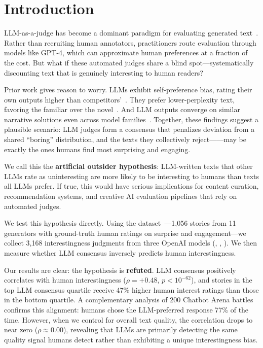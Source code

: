 \section{Introduction}
\label{sec:intro}

LLM-as-a-judge has become a dominant paradigm for evaluating generated text~\citep{zheng2023judging}.
Rather than recruiting human annotators, practitioners route evaluation through models like GPT-4, which can approximate human preferences at a fraction of the cost.
But what if these automated judges share a blind spot---systematically discounting text that is genuinely interesting to human readers?

Prior work gives reason to worry.
LLMs exhibit self-preference bias, rating their own outputs higher than competitors'~\citep{panickssery2024llm}.
They prefer lower-perplexity text, favoring the familiar over the novel~\citep{wataoka2024self}.
And LLM outputs converge on similar narrative solutions even across model families~\citep{echoes2024}.
Together, these findings suggest a plausible scenario: LLM judges form a consensus that penalizes deviation from a shared ``boring'' distribution, and the texts they collectively reject---\outsiders---may be exactly the ones humans find most surprising and engaging.

We call this the \textbf{artificial outsider hypothesis}: LLM-written texts that other LLMs rate as uninteresting are more likely to be interesting to humans than texts all LLMs prefer.
If true, this would have serious implications for content curation, recommendation systems, and creative AI evaluation pipelines that rely on automated judges.

We test this hypothesis directly.
Using the \hanna dataset~\citep{chhun2022hanna}---1,056 stories from 11 generators with ground-truth human ratings on surprise and engagement---we collect 3,168 interestingness judgments from three OpenAI models (\gptfo, \gptfomini, \gptfourmini).
We then measure whether LLM consensus inversely predicts human interestingness.

Our results are clear: the hypothesis is \textbf{refuted}.
LLM consensus positively correlates with human interestingness ($\rho = +0.48$, $p < 10^{-62}$), and stories in the top LLM consensus quartile receive 47\% higher human interest ratings than those in the bottom quartile.
A complementary analysis of 200 Chatbot Arena battles~\citep{lmsys2023arena} confirms this alignment: humans chose the LLM-preferred response 77\% of the time.
However, when we control for overall text quality, the correlation drops to near zero ($\rho \approx 0.00$), revealing that LLMs are primarily detecting the same quality signal humans detect rather than exhibiting a unique interestingness bias.

